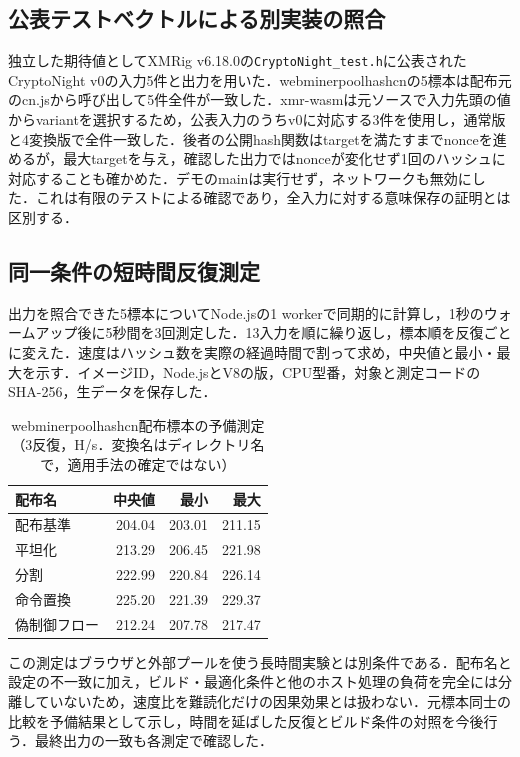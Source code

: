 \documentclass[submit,techrep]{ipsj}
\begin{document}
\subsection{公表テストベクトルによる別実装の照合}
独立した期待値としてXMRig v6.18.0の\texttt{CryptoNight\_test.h}に公表されたCryptoNight v0の入力5件と出力を用いた\cite{xmrigvectors}．webminerpoolhashcnの5標本は配布元のcn.jsから呼び出して5件全件が一致した．xmr-wasmは元ソースで入力先頭の値からvariantを選択するため，公表入力のうちv0に対応する3件を使用し，通常版と4変換版で全件一致した．後者の公開hash関数はtargetを満たすまでnonceを進めるが，最大targetを与え，確認した出力ではnonceが変化せず1回のハッシュに対応することも確かめた．デモのmainは実行せず，ネットワークも無効にした．これは有限のテストによる確認であり，全入力に対する意味保存の証明とは区別する．

\subsection{同一条件の短時間反復測定}
出力を照合できた5標本についてNode.jsの1 workerで同期的に計算し，1秒のウォームアップ後に5秒間を3回測定した．13入力を順に繰り返し，標本順を反復ごとに変えた．速度はハッシュ数を実際の経過時間で割って求め，中央値と最小・最大を示す．イメージID，Node.jsとV8の版，CPU型番，対象と測定コードのSHA-256，生データを保存した．
\begin{table}[t]
\caption{webminerpoolhashcn配布標本の予備測定（3反復，H/s．変換名はディレクトリ名で，適用手法の確定ではない）}
\label{tab:proof-preliminary}
\centering\small
\begin{tabular}{lrrr}
\hline
配布名 & 中央値 & 最小 & 最大 \\
\hline
配布基準 & 204.04 & 203.01 & 211.15 \\
平坦化 & 213.29 & 206.45 & 221.98 \\
分割 & 222.99 & 220.84 & 226.14 \\
命令置換 & 225.20 & 221.39 & 229.37 \\
偽制御フロー & 212.24 & 207.78 & 217.47 \\
\hline
\end{tabular}
\end{table}

この測定はブラウザと外部プールを使う長時間実験とは別条件である．配布名と設定の不一致に加え，ビルド・最適化条件と他のホスト処理の負荷を完全には分離していないため，速度比を難読化だけの因果効果とは扱わない．元標本同士の比較を予備結果として示し，時間を延ばした反復とビルド条件の対照を今後行う．最終出力の一致も各測定で確認した．
\end{document}

